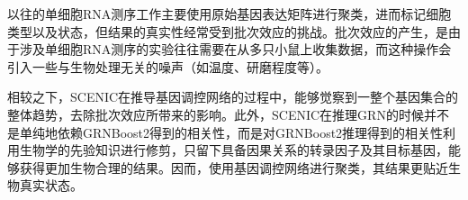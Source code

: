   以往的单细胞RNA测序工作主要使用原始基因表达矩阵进行聚类，进而标记细胞类型以及状态，但结果的真实性经常受到批次效应的挑战。批次效应的产生，是由于涉及单细胞RNA测序的实验往往需要在从多只小鼠上收集数据，而这种操作会引入一些与生物处理无关的噪声（如温度、研磨程度等）。

  相较之下，SCENIC在推导基因调控网络的过程中，能够觉察到一整个基因集合的整体趋势，去除批次效应所带来的影响。此外，SCENIC在推理GRN的时候并不是单纯地依赖GRNBoost2得到的相关性，而是对GRNBoost2推理得到的相关性利用生物学的先验知识进行修剪，只留下具备因果关系的转录因子及其目标基因，能够获得更加生物合理的结果。因而，使用基因调控网络进行聚类，其结果更贴近生物真实状态。

